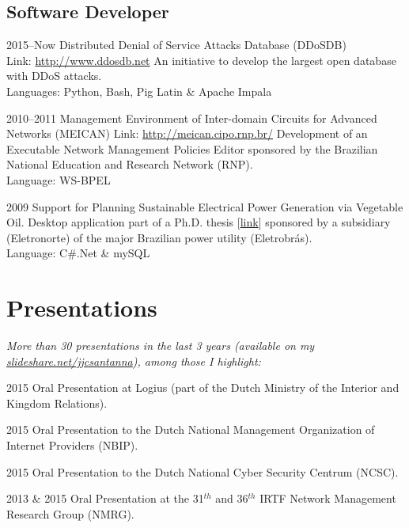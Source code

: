 \documentclass[]{friggeri-cv} %
\begin{document}
\subsection{Software Developer}
\begin{entrylist}

\entry
{2015--Now}
{Distributed Denial of Service Attacks Database (DDoSDB)}
{\\Link: \href{http://ddosdb.net}{http://www.ddosdb.net} }
{An initiative to develop the largest open database with DDoS attacks.\\
Languages: Python, Bash, Pig Latin \& Apache Impala
}

\entry
{2010--2011}
{{Management Environment of Inter-domain Circuits for Advanced Networks (MEICAN)}}
{Link: \href{http://meican.cipo.rnp.br/}{http://meican.cipo.rnp.br/}}
{Development of an Executable Network Management Policies Editor sponsored by the Brazilian National Education and Research Network (RNP).    \\
Language: WS-BPEL
}

\entry
{2009}
{Support for Planning Sustainable Electrical Power Generation via Vegetable Oil.}
{}
{Desktop application part of a Ph.D. thesis [\href{https://sites.google.com/site/ceamazonufpa/TeseAnaRosaDuarte.pdf}{link}] sponsored by a subsidiary (Eletronorte) of the major Brazilian power utility (Eletrobrás).\\
Language: C\#.Net \& mySQL
}
\end{entrylist}

\section{Presentations}
\emph{More than 30 presentations in the last 3 years (available on my  \href{http://www.slideshare.net/jjcsantanna}{slideshare.net/jjcsantanna}), among those I highlight:}

\begin{entrylist}

\vspace{-0.3cm}
\entry
{2015}
{Oral Presentation}
{at Logius (part of the Dutch Ministry of the Interior and Kingdom Relations).}

\vspace{-0.3cm}
\entry
{2015}
{Oral Presentation}
{to the Dutch National Management Organization of Internet Providers (NBIP).}

\vspace{-0.3cm}
\entry
{2015}
{Oral Presentation}
{to the Dutch National Cyber Security Centrum (NCSC).}

\vspace{-0.3cm}
\entry
{2013 \& 2015}
{Oral Presentation}
{at the 31$^{th}$ and 36$^{th}$ IRTF Network Management Research Group (NMRG).}

\end{entrylist}
\end{document}
